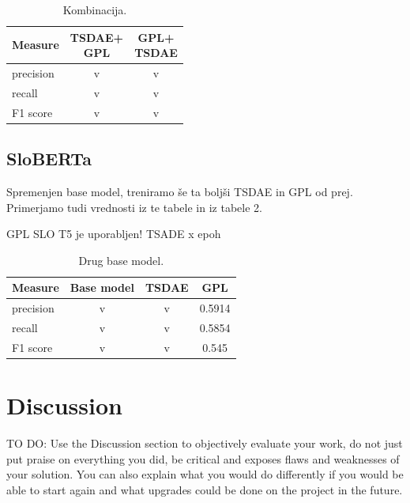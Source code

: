 \documentclass[fleqn,moreauthors,10pt]{ds_report}
\begin{document}
\begin{table}[!h]
	\footnotesize
	\begin{center}
		\begin{tabular}{ |l|c|c| }
		\hline
		\rowcolor{Red}Measure & \thead{TSDAE+\\GPL} & \thead{GPL+\\TSDAE} \\
		\hline

		precision & v & v\\
		recall & v & v\\
		F1 score & v & v\\

		\hline
		\end{tabular}
	\end{center}
\caption{Kombinacija.}
\label{tab4}
\end{table}


\subsection*{SloBERTa}
Spremenjen base model, treniramo še ta boljši TSDAE in GPL od prej.
Primerjamo tudi vrednosti iz te tabele in iz tabele 2.

GPL SLO T5 je uporabljen!
TSADE x epoh

\begin{table}[!h]
	\footnotesize
	\begin{center}
		\begin{tabular}{ |l|c|c|c| }
		\hline
		\rowcolor{Red}Measure & Base model & TSDAE & GPL \\
		\hline

		precision & v & v & 0.5914\\
		recall & v & v & 0.5854\\
		F1 score & v & v & 0.545\\

		\hline
		\end{tabular}
	\end{center}
\caption{Drug base model.}
\label{tab5}
\end{table}





\section*{Discussion}

TO DO:
Use the Discussion section to objectively evaluate your work, do not just put praise on everything you did, be critical and exposes flaws and weaknesses of your solution. You can also explain what you would do differently if you would be able to start again and what upgrades could be done on the project in the future.
\end{document}
